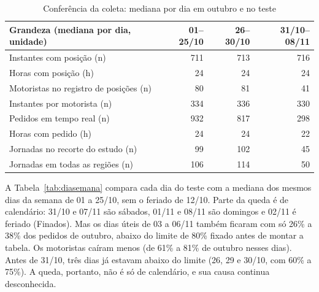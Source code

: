 \begin{table}[!htb]
\caption{Conferência da coleta: mediana por dia em outubro e no teste}\label{tab:dados}
\centering\fontetabela
\begin{tabular}{|l|r|r|r|}
\hline
\textbf{Grandeza (mediana por dia, unidade)} & \textbf{01--25/10} & \textbf{26--30/10} & \textbf{31/10--08/11} \\
\hline
Instantes com posição (n) & 711 & 713 & 716 \\
\hline
Horas com posição (h) & 24 & 24 & 24 \\
\hline
Motoristas no registro de posições (n) & 80 & 81 & 41 \\
\hline
Instantes por motorista (n) & 334 & 336 & 330 \\
\hline
Pedidos em tempo real (n) & 932 & 817 & 298 \\
\hline
Horas com pedido (h) & 24 & 24 & 22 \\
\hline
Jornadas no recorte do estudo (n) & 99 & 102 & 45 \\
\hline
Jornadas em todas as regiões (n) & 106 & 114 & 50 \\
\hline
\end{tabular}
\end{table}

A Tabela~\ref{tab:diasemana} compara cada dia do teste com a mediana dos mesmos dias da semana de 01 a 25/10, sem o feriado de 12/10. Parte da queda é de calendário: 31/10 e 07/11 são sábados, 01/11 e 08/11 são domingos e 02/11 é feriado (Finados). Mas os dias úteis de 03 a 06/11 também ficaram com só 26\% a 38\% dos pedidos de outubro, abaixo do limite de 80\% fixado antes de montar a tabela. Os motoristas caíram menos (de 61\% a 81\% de outubro nesses dias). Antes de 31/10, três dias já estavam abaixo do limite (26, 29 e 30/10, com 60\% a 75\%). A queda, portanto, não é só de calendário, e sua causa continua desconhecida.

